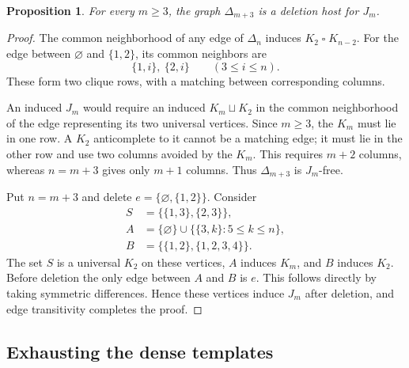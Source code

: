 \documentclass[11pt,reqno]{amsart}
\newtheorem{proposition}[theorem]{Proposition}
\theoremstyle{definition}
\theoremstyle{remark}
\begin{document}
\begin{proposition}\label{prop:Jm}
For every $m\ge3$, the graph $\Delta_{m+3}$ is a deletion host for $J_m$.
\end{proposition}
\begin{proof}
The common neighborhood of any edge of $\Delta_n$ induces $K_2\mathbin{\square}K_{n-2}$. For the edge between $\varnothing$ and $\{1,2\}$, its common neighbors are
\[
 \{1,i\},\ \{2,i\}\qquad(3\le i\le n).
\]
These form two clique rows, with a matching between corresponding columns.

An induced $J_m$ would require an induced $K_m\sqcup K_2$ in the common neighborhood of the edge representing its two universal vertices. Since $m\ge3$, the $K_m$ must lie in one row. A $K_2$ anticomplete to it cannot be a matching edge; it must lie in the other row and use two columns avoided by the $K_m$. This requires $m+2$ columns, whereas $n=m+3$ gives only $m+1$ columns. Thus $\Delta_{m+3}$ is $J_m$-free.

Put $n=m+3$ and delete $e=\{\varnothing,\{1,2\}\}$. Consider
\begin{align*}
 S&=\{\{1,3\},\{2,3\}\},\\
 A&=\{\varnothing\}\cup\{\{3,k\}:5\le k\le n\},\\
 B&=\{\{1,2\},\{1,2,3,4\}\}.
\end{align*}
The set $S$ is a universal $K_2$ on these vertices, $A$ induces $K_m$, and $B$ induces $K_2$. Before deletion the only edge between $A$ and $B$ is $e$. This follows directly by taking symmetric differences. Hence these vertices induce $J_m$ after deletion, and edge transitivity completes the proof.
\end{proof}

\subsection{Exhausting the dense templates}
\end{document}
